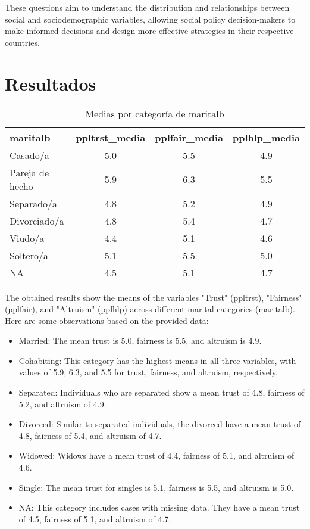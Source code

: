 \documentclass{article}
\begin{document}
These questions aim to understand the distribution and relationships between social and sociodemographic variables, allowing social policy decision-makers to make informed decisions and design more effective strategies in their respective countries.



\section{Resultados}





\begin{table}[ht]
\centering
\caption{Medias por categoría de maritalb}
\begin{tabular}{|l|c|c|c|}
\hline
maritalb & ppltrst\_media & pplfair\_media & pplhlp\_media \\
\hline
Casado/a & 5.0 & 5.5 & 4.9 \\
Pareja de hecho & 5.9 & 6.3 & 5.5 \\
Separado/a & 4.8 & 5.2 & 4.9 \\
Divorciado/a & 4.8 & 5.4 & 4.7 \\
Viudo/a & 4.4 & 5.1 & 4.6 \\
Soltero/a & 5.1 & 5.5 & 5.0 \\
NA & 4.5 & 5.1 & 4.7 \\
\hline
\end{tabular}
\end{table}


The obtained results show the means of the variables "Trust" (ppltrst), "Fairness" (pplfair), and "Altruism" (pplhlp) across different marital categories (maritalb). Here are some observations based on the provided data:

\begin{itemize}
  \item Married: The mean trust is 5.0, fairness is 5.5, and altruism is 4.9.
  \item Cohabiting: This category has the highest means in all three variables, with values of 5.9, 6.3, and 5.5 for trust, fairness, and altruism, respectively.
  \item Separated: Individuals who are separated show a mean trust of 4.8, fairness of 5.2, and altruism of 4.9.
  \item Divorced: Similar to separated individuals, the divorced have a mean trust of 4.8, fairness of 5.4, and altruism of 4.7.
  \item Widowed: Widows have a mean trust of 4.4, fairness of 5.1, and altruism of 4.6.
  \item Single: The mean trust for singles is 5.1, fairness is 5.5, and altruism is 5.0.
  \item NA: This category includes cases with missing data. They have a mean trust of 4.5, fairness of 5.1, and altruism of 4.7.
\end{itemize}
\end{document}
